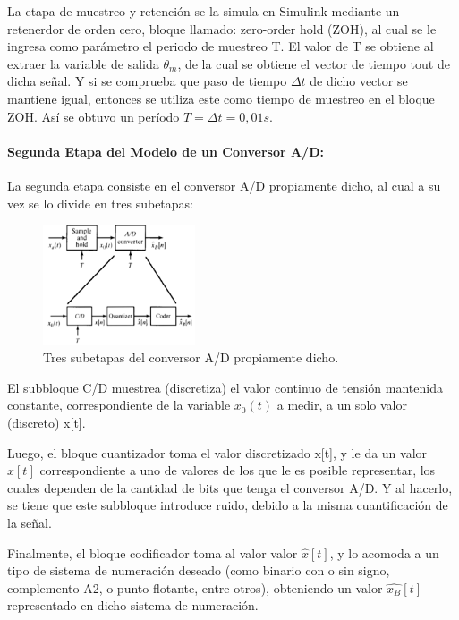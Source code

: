 \documentclass{article}
\begin{document}
\begin{sloppypar}
La etapa de muestreo y retención se la simula en Simulink mediante un retenerdor de orden cero, bloque llamado: zero-order hold (ZOH), al cual se le ingresa como parámetro el periodo de muestreo T. El valor de T se obtiene al extraer la variable de salida $\theta_m$, de la cual se obtiene el vector de tiempo tout de dicha señal. Y si se comprueba que paso de tiempo $\Delta t$ de dicho vector se mantiene igual, entonces se utiliza este como tiempo de muestreo en el bloque ZOH. Así se obtuvo un período $T=\Delta t=0,01s$.

\paragraph{Segunda Etapa del Modelo de un Conversor A/D:}
\label{sec:Segunda Etapa del Modelo de un Conversor A/D:}
\hfill

\hfill

La segunda etapa consiste en el conversor A/D propiamente dicho, al cual a su vez se lo divide en tres subetapas:

\begin{figure}[H]
    \centering
    \includegraphics[width=0.4\textwidth]{Tres subetapas del conversor AD propiamente dicho}
    \caption{Tres subetapas del conversor A/D propiamente dicho.}
    \label{fig:Tres subetapas del conversor A/D propiamente dicho}
\end{figure}

El subbloque C/D muestrea (discretiza) el valor continuo de tensión mantenida constante, correspondiente de la variable $x_0(t)$ a medir, a un solo valor (discreto) x[t].

Luego, el bloque cuantizador toma el valor discretizado x[t], y le da un valor $\hat{x}[t]$ correspondiente a uno de valores de los que le es posible representar, los cuales dependen de la cantidad de bits que tenga el conversor A/D. Y al hacerlo, se tiene que este subbloque introduce ruido, debido a la misma cuantificación de la señal.

Finalmente, el bloque codificador toma al valor valor $\hat{x}[t]$, y lo acomoda a un tipo de sistema de numeración deseado (como binario con o sin signo, complemento A2, o punto flotante, entre otros), obteniendo un valor $\hat{x_B}[t]$ representado en dicho sistema de numeración.


\end{sloppypar}
\end{document}
